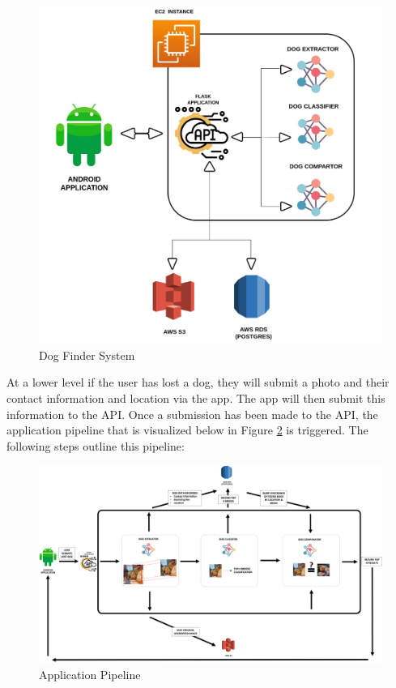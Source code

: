 \documentclass{article}
\begin{document}
\begin{figure}[h]
\centering
	\includegraphics[scale=0.1]{final-report-images/system.jpeg}
\caption{Dog Finder System}
\label{fig:x app system}
\end{figure}

At a lower level if the user has lost a dog, they will submit a photo and their contact information and location via the app.  The app will then submit this information to the API.  Once a submission has been made to the API, the application pipeline that is visualized below in Figure \ref{fig:x app pipeline} is triggered.  The following steps outline this pipeline:
\newpage

\begin{figure}[h]
\centering
	\includegraphics[width=1.0\textwidth]{final-report-images/applowlevel.png}
\caption{Application Pipeline}
\label{fig:x app pipeline}
\end{figure}
\end{document}
